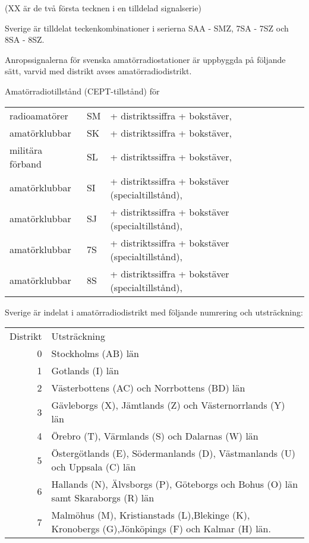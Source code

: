 (XX är de två första tecknen i en tilldelad signalserie)

Sverige är tilldelat teckenkombinationer i serierna SAA - SMZ, 7SA - 7SZ och
8SA - 8SZ.

Anropssignalerna för svenska amatörradiostationer är uppbyggda på följande
sätt, varvid med distrikt avses amatörradiodistrikt.

Amatörradiotillstånd (CEPT-tillstånd) för
\begin{tabular}{lll}
radioamatörer & SM & + distriktssiffra + bokstäver,  \\
amatörklubbar & SK & + distriktssiffra + bokstäver,  \\
militära förband & SL & + distriktssiffra + bokstäver, \\
amatörklubbar & SI & + distriktssiffra + bokstäver (specialtillstånd), \\
amatörklubbar & SJ & + distriktssiffra + bokstäver (specialtillstånd), \\
amatörklubbar & 7S & + distriktssiffra + bokstäver (specialtillstånd), \\
amatörklubbar & 8S & + distriktssiffra + bokstäver (specialtillstånd), \\
\end{tabular}


Sverige är indelat i amatörradiodistrikt med följande numrering och
utsträckning:

\begin{tabular}{rp{5cm}}
Distrikt & Utsträckning \\
0 & Stockholms (AB) län \\
1 & Gotlands (I) län \\
2 & Västerbottens (AC) och Norrbottens (BD) län \\
3 & Gävleborgs (X), Jämtlands (Z) och Västernorrlands (Y) län \\
4 & Örebro (T), Värmlands (S) och Dalarnas (W) län \\
5 & Östergötlands (E), Södermanlands (D), Västmanlands (U) och Uppsala (C) län\\
6 & Hallands (N), Älvsborgs (P), Göteborgs och Bohus (O) län samt Skaraborgs (R) län \\
7 & Malmöhus (M), Kristianstads (L),Blekinge (K), Kronobergs (G),Jönköpings (F) och Kalmar (H) län.\\
\end{tabular}

